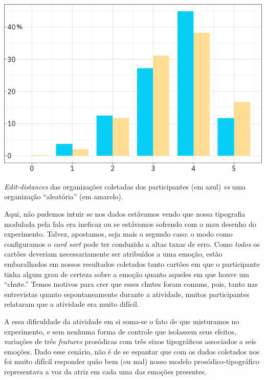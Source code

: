 \documentclass[a4paper]{tufte-handout}
\begin{document}
\begin{marginfigure}[-9\baselineskip]
  \includegraphics{imgs/edit_distance_reais.png}
  \caption{\textit{Edit-distances} das organizações coletadas dos participantes (em azul) \textit{vs} uma organização ``aleatória'' (em amarelo).}
  \label{edit_dist_1}
\end{marginfigure}

Aqui, não pudemos intuir se nos dados estávamos vendo que nossa tipografia modulada pela fala era ineficaz ou se estávamos sofrendo com o mau desenho do experimento. Talvez, apostamos, seja mais o segundo caso: o modo como configuramos o \textit{card sort} pode ter conduzido a altas taxas de erro. Como \textit{todos} os cartões deveriam necessariamente ser atribuídos a uma emoção, estão embaralhados em nossos resultados coletados tanto cartões em que o participante tinha algum grau de certeza sobre a emoção quanto aqueles em que houve um ``chute.'' Temos motivos para crer que esses chutes foram comuns, pois, tanto nas entrevistas quanto espontaneamente durante a atividade, muitos participantes relataram que a atividade era muito difícil.

A essa dificuldade da atividade em si soma-se o fato de que misturamos no experimento, e sem nenhuma forma de controle que isolassem seus efeitos, variações de três \textit{features} prosódicas com três eixos tipográficos associados a seis emoções. Dado esse cenário, não é de se espantar que com os dados coletados nos foi muito difícil responder quão bem (ou mal) nosso modelo prosódico-tipográfico representava a voz da atriz em cada uma das emoções presentes. 
\end{document}
